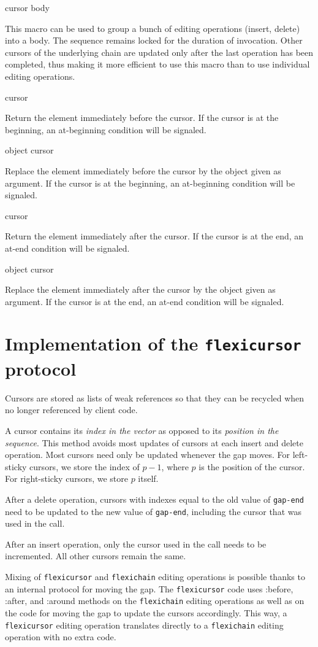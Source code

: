 \documentclass[11pt]{article}
\begin{document}
 {cursor \body body}

This macro can be used to group a bunch of editing operations (insert,
delete) into a body.  The sequence remains locked for the duration of
invocation.  Other cursors of the underlying chain are updated only
after the last operation has been completed, thus making it more
efficient to use this macro than to use individual editing operations.

 {cursor}

Return the element immediately before the cursor.  If the cursor is
at the beginning, an at-beginning condition will be signaled. 

 {object cursor}

Replace the element immediately before the cursor by the object given
as argument.  If the cursor is at the beginning, an at-beginning
condition will be signaled.

 {cursor}

Return the element immediately after the cursor.  If the cursor is
at the end, an at-end condition will be signaled. 

 {object cursor}

Replace the element immediately after the cursor by the object given
as argument.  If the cursor is at the end, an at-end condition will be
signaled.

\section{Implementation of the \texttt{flexicursor} protocol}

Cursors are stored as lists of weak references so that they can be
recycled when no longer referenced by client code. 

A cursor contains its \textit{index in the vector} as opposed to its
\textit{position in the sequence}.  This method avoids most updates of
cursors at each insert and delete operation.  Most cursors need only
be updated whenever the gap moves.  For left-sticky cursors, we store
the index of $p-1$, where $p$ is the position of the cursor.  For
right-sticky cursors, we store $p$ itself. 

After a delete operation, cursors with indexes equal to the old value
of \texttt{gap-end} need to be updated to the new value of
\texttt{gap-end}, including the cursor that was used in the call.

After an insert operation, only the cursor used in the call needs to
be incremented.  All other cursors remain the same.

Mixing of \texttt{flexicursor} and \texttt{flexichain} editing
operations is possible thanks to an internal protocol for moving the
gap.  The \texttt{flexicursor} code uses :before, :after, and :around
methods on the \texttt{flexichain} editing operations as well as on
the code for moving the gap to update the cursors accordingly.  This
way, a \texttt{flexicursor} editing operation translates directly to a
\texttt{flexichain} editing operation with no extra code.
\end{document}
